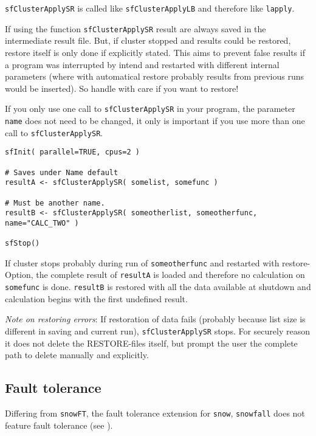 \documentclass[10pt,oneside]{article}
\begin{document}
\texttt{sfClusterApplySR} is called like \texttt{sfClusterApplyLB} and
therefore like \texttt{lapply}.

If using the function \texttt{sfClusterApplySR} result are always saved
in the intermediate result file. But, if cluster stopped and results
could be restored, restore itself is only done if explicitly stated.
This aims to prevent false results if a program was interrupted by
intend and restarted with different internal parameters (where with
automatical restore probably results from previous runs would be
inserted). So handle with care if you want to restore!

If you only use one call to \texttt{sfClusterApplySR} in your program,
the parameter \texttt{name} does not need to be changed, it only is
important if you use more than one call to \texttt{sfClusterApplySR}.

\begin{center}
\begin{verbatim}
sfInit( parallel=TRUE, cpus=2 )

# Saves under Name default
resultA <- sfClusterApplySR( somelist, somefunc )

# Must be another name.
resultB <- sfClusterApplySR( someotherlist, someotherfunc, name="CALC_TWO" )

sfStop()
\end{verbatim}
\end{center}

If cluster stops probably during run of \texttt{someotherfunc} and
restarted with restore-Option, the complete result of \texttt{resultA}
is loaded and therefore no calculation on \texttt{somefunc} is done.
\texttt{resultB} is restored with all the data available at shutdown
and calculation begins with the first undefined result.

\emph{Note on restoring errors}: If restoration of data fails (probably
because list size is different in saving and current run),
\texttt{sfClusterApplySR} stops. For securely reason it does not delete
the RESTORE-files itself, but prompt the user the complete path to
delete manually and explicitly.

\subsection{Fault tolerance}
Differing from \texttt{snowFT}, the fault tolerance extension for
\texttt{snow}, \texttt{snowfall} does not feature fault tolerance
(see \cite{HANA_04}).
\end{document}

